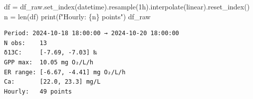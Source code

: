\documentclass[
  letterpaper,
  DIV=11,
  numbers=noendperiod]{scrartcl}
\newenvironment{Shaded}{\begin{snugshade}}{\end{snugshade}}
\newcommand{\BuiltInTok}[1]{\textcolor[rgb]{0.00,0.23,0.31}{#1}}
\newcommand{\NormalTok}[1]{\textcolor[rgb]{0.00,0.23,0.31}{#1}}
\newcommand{\OperatorTok}[1]{\textcolor[rgb]{0.37,0.37,0.37}{#1}}
\newcommand{\SpecialCharTok}[1]{\textcolor[rgb]{0.37,0.37,0.37}{#1}}
\newcommand{\SpecialStringTok}[1]{\textcolor[rgb]{0.13,0.47,0.30}{#1}}
\newcommand{\StringTok}[1]{\textcolor[rgb]{0.13,0.47,0.30}{#1}}
\begin{document}
\begin{Shaded}
\begin{Highlighting}[]
\NormalTok{df }\OperatorTok{=}\NormalTok{ df\_raw.set\_index(}\StringTok{\textquotesingle{}datetime\textquotesingle{}}\NormalTok{).resample(}\StringTok{\textquotesingle{}1h\textquotesingle{}}\NormalTok{).interpolate(}\StringTok{\textquotesingle{}linear\textquotesingle{}}\NormalTok{).reset\_index()}
\NormalTok{n }\OperatorTok{=} \BuiltInTok{len}\NormalTok{(df)}
\BuiltInTok{print}\NormalTok{(}\SpecialStringTok{f"Hourly:   }\SpecialCharTok{\{}\NormalTok{n}\SpecialCharTok{\}}\SpecialStringTok{ points"}\NormalTok{)}
\NormalTok{df\_raw}
\end{Highlighting}
\end{Shaded}

\begin{verbatim}
Period: 2024-10-18 18:00:00 → 2024-10-20 18:00:00
N obs:    13
δ13C:     [-7.69, -7.03] ‰
GPP max:  10.05 mg O₂/L/h
ER range: [-6.67, -4.41] mg O₂/L/h
Ca:       [22.0, 23.3] mg/L
Hourly:   49 points
\end{verbatim}
\end{document}

